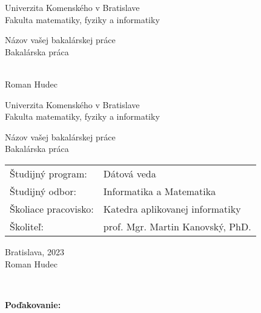 \documentclass[12pt, twoside]{book}
\def\mfrok{2023}
\def\mfnazov{Názov vašej bakalárskej práce}
\def\mftyp{Bakalárska práca}
\def\mfautor{Roman Hudec}
\def\mfskolitel{prof. Mgr. Martin Kanovský, PhD. }
\def\mfmiesto{Bratislava, \mfrok}
\def\mfodbor{ Informatika a Matematika }
\def\program{ Dátová veda }
\def\mfpracovisko{ Katedra aplikovanej informatiky }
\begin{document}
     
\frontmatter
\pagestyle{empty}


\begin{center}
\sc\large
Univerzita Komenského v Bratislave\\
Fakulta matematiky, fyziky a informatiky

\vfill

{\LARGE\mfnazov}\\
\mftyp
\end{center}

\vfill

{\sc\large 
\noindent \mfrok\\
\mfautor
}

\cleardoublepage

\noindent

\begin{center}
\sc  
\large
Univerzita Komenského v Bratislave\\
Fakulta matematiky, fyziky a informatiky

\vfill

{\LARGE\mfnazov}\\
\mftyp
\end{center}

\vfill

\noindent
\begin{tabular}{ll}
Študijný program: & \program \\
Študijný odbor: & \mfodbor \\
Školiace pracovisko: & \mfpracovisko \\
Školiteľ: & \mfskolitel \\
\end{tabular}

\vfill


\noindent \mfmiesto\\
\mfautor

\cleardoublepage



\newpage 
\setcounter{page}{2}






\newpage 
\pagestyle{plain}
~

\vfill
{\bf Poďakovanie:}


\newpage 
\end{document}

